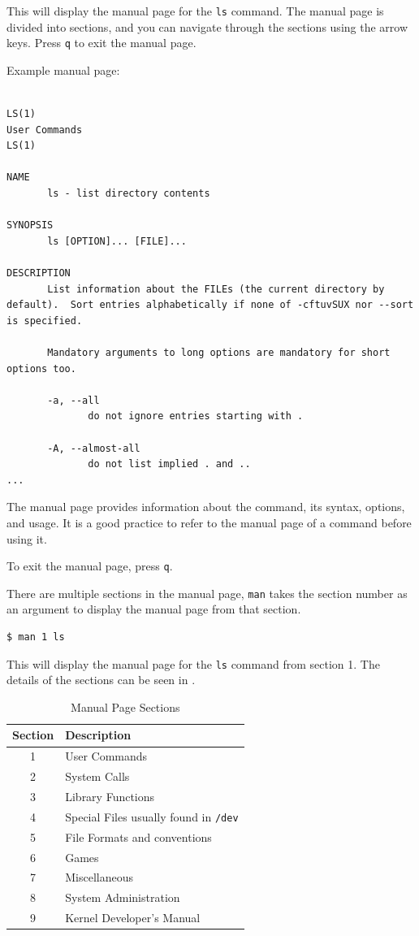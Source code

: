 This will display the manual page for the \texttt{ls} command. The manual page is divided into sections, and you can navigate through the sections using the arrow keys. Press \texttt{q} to exit the manual page.

Example manual page:

\begin{lstlisting}

LS(1)                                                                                User Commands                                                                               LS(1)

NAME
       ls - list directory contents

SYNOPSIS
       ls [OPTION]... [FILE]...

DESCRIPTION
       List information about the FILEs (the current directory by default).  Sort entries alphabetically if none of -cftuvSUX nor --sort is specified.

       Mandatory arguments to long options are mandatory for short options too.

       -a, --all
              do not ignore entries starting with .

       -A, --almost-all
              do not list implied . and ..
...
\end{lstlisting}

The manual page provides information about the command, its syntax, options, and usage.
It is a good practice to refer to the manual page of a command before using it.

To exit the manual page, press \texttt{q}.

There are multiple sections in the manual page, \texttt{man} takes the section number as an argument to display the manual page from that section.

\begin{lstlisting}[language=bash]
  $ man 1 ls
\end{lstlisting}

This will display the manual page for the \texttt{ls} command from section 1. The details of the sections can be seen in .

\begin{table}[h!]
\caption{Manual Page Sections}
\begin{tabular}{ c l }
  \toprule
 Section & Description \\
 \midrule
  1 & User Commands \\
  2 & System Calls \\
  3 & Library Functions \\
  4 & Special Files usually found in \texttt{/dev} \\
  5 & File Formats and conventions \\
  6 & Games \\
  7 & Miscellaneous \\
  8 & System Administration \\
  9 & Kernel Developer's Manual \\
  \bottomrule
\end{tabular}
\end{table}

